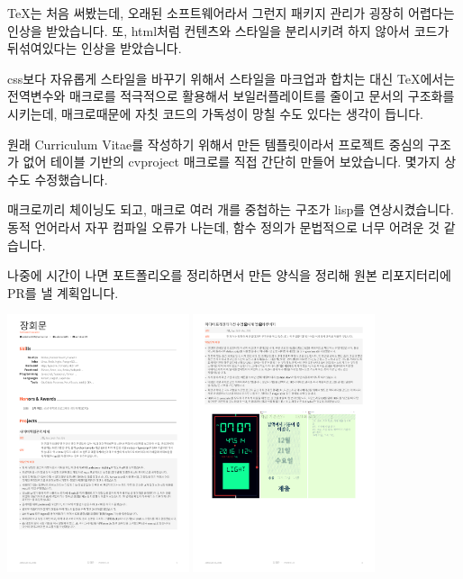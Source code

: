 \begin{cvprojects}
{  	} %
  	{
  		\begin{cvitems}
  		  \item{\TeX{}는 처음 써봤는데, 오래된 소프트웨어라서 그런지 패키지 관리가 굉장히 어렵다는 인상을 받았습니다. 또, html처럼 컨텐츠와 스타일을 분리시키려 하지 않아서 코드가 뒤섞여있다는 인상을 받았습니다.}
  		  \item{css보다 자유롭게 스타일을 바꾸기 위해서 스타일을 마크업과 합치는 대신 \TeX{}에서는 전역변수와 매크로를 적극적으로 활용해서 보일러플레이트를 줄이고 문서의 구조화를 시키는데, 매크로때문에 자칫 코드의 가독성이 망칠 수도 있다는 생각이 듭니다. }
  		  \item{원래 Curriculum Vitae를 작성하기 위해서 만든 템플릿이라서 프로젝트 중심의 구조가 없어 테이블 기반의 cvproject 매크로를 직접 간단히 만들어 보았습니다. 몇가지 상수도 수정했습니다. }
  		  \item{매크로끼리 체이닝도 되고, 매크로 여러 개를 중첩하는 구조가 lisp를 연상시켰습니다. 동적 언어라서 자꾸 컴파일 오류가 나는데, 함수 정의가 문법적으로 너무 어려운 것 같습니다.}
  		  \item{나중에 시간이 나면 포트폴리오를 정리하면서 만든 양식을 정리해 원본 리포지터리에 PR를 낼 계획입니다.}
  		\end{cvitems}
  	} %
  	{} %
    \includegraphics[width=0.4\textwidth]{./cv/cv1}
    \includegraphics[width=0.4\textwidth]{./cv/cv2}  	  	
  	  	
\end{cvprojects}

